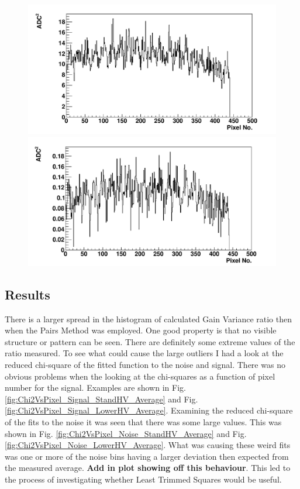 \begin{figure} %
\includegraphics[width=\textwidth]{chapters/graphs/GainVarsMeas/LL_m04_2016-06-11/Set0and2/varianceHist_StandHV_Average_set0and2.pdf}
\caption{}\label{fig:VarsVsPixel_StandardHV_Average}
\vspace{3mm}
\includegraphics[width=\textwidth]{chapters/graphs/GainVarsMeas/LL_m04_2016-06-11/Set0and2/varianceHist_LowHV_Average_set0and2.pdf}
\caption{}\label{fig:VarsVsPixel_LowerHV_Average}
\end{figure}

\subsection{Results}

There is a larger spread in the histogram of calculated Gain Variance ratio then when the Pairs Method was employed. One good property is that no visible structure or pattern can be seen. There are definitely some extreme values of the ratio measured. To see what could cause the large outliers I had a look at the reduced chi-square of the fitted function to the noise and signal. There was no obvious problems when the looking at the chi-squares as a function of pixel number for the signal. Examples are shown in Fig. \ref{fig:Chi2VsPixel_Signal_StandHV_Average} and Fig. \ref{fig:Chi2VsPixel_Signal_LowerHV_Average}. Examining the reduced chi-square of the fits to the noise it was seen that there was some large values. This was shown in Fig. \ref{fig:Chi2VsPixel_Noise_StandHV_Average} and Fig. \ref{fig:Chi2VsPixel_Noise_LowerHV_Average}. What was causing these weird fits was one or more of the noise bins having a larger deviation then expected from the measured average. \textbf{Add in plot showing off this behaviour}. This led to the process of investigating whether Least Trimmed Squares would be useful.

